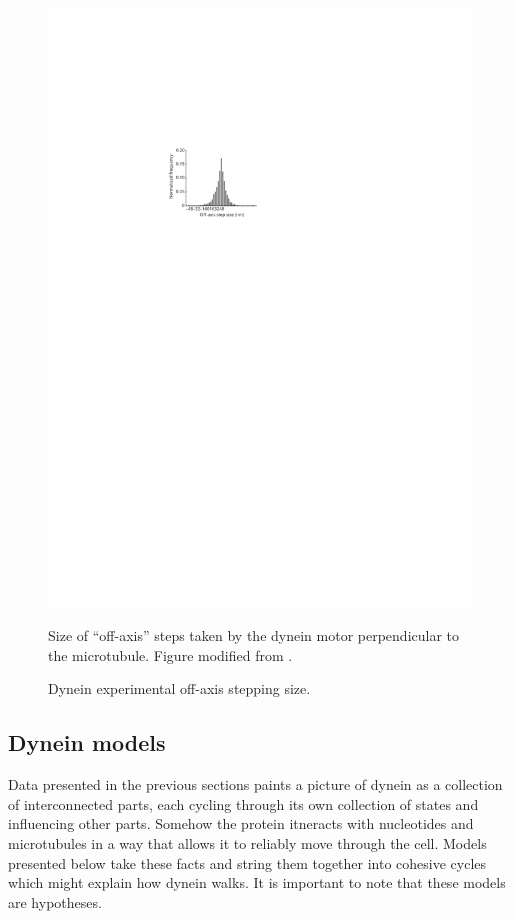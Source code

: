 \documentclass[10pt]{article} %
\begin{document}
\begin{figure}[h!]
\begin{minipage}[b]{0.45\textwidth}
    \includegraphics[width=\textwidth]{../../figures/weihong-off-axis-steps}
    \caption{Dynein experimental off-axis stepping size.}{Size of ``off-axis'' steps taken by the dynein motor perpendicular to the microtubule. Figure modified from \cite{weihongpaper}.}
  \end{minipage}
  \label{fig:weihong-steps}
\end{figure}

\subsection{Dynein models}
Data presented in the previous sections paints a picture of dynein as a collection of interconnected parts, each cycling through its own collection of states and influencing other parts. Somehow the protein itneracts with nucleotides and microtubules in a way that allows it to reliably move through the cell. Models presented below take these facts and string them together into cohesive cycles which might explain how dynein walks. It is important to note that these models are hypotheses.\\
\end{document}
